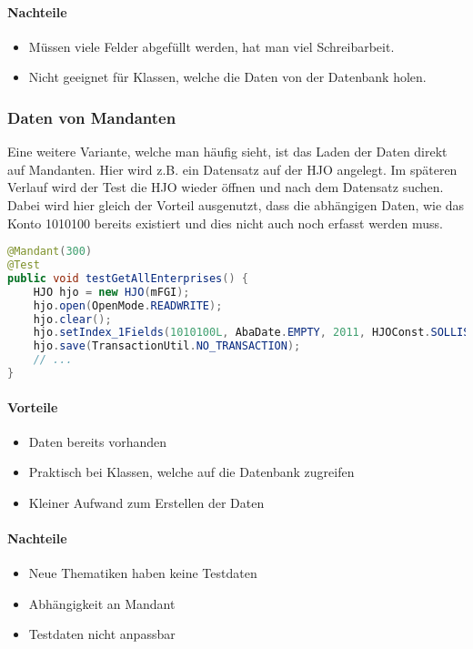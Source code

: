 \paragraph{Nachteile}
\begin{itemize}
\item Müssen viele Felder abgefüllt werden, hat man viel Schreibarbeit.
\item Nicht geeignet für Klassen, welche die Daten von der Datenbank holen.
\end{itemize}
\subsubsection{Daten von Mandanten}
Eine weitere Variante, welche man häufig sieht, ist das Laden der Daten direkt auf Mandanten. Hier wird z.B. ein Datensatz auf der HJO angelegt. Im späteren Verlauf wird der Test die HJO wieder öffnen und nach dem Datensatz suchen. Dabei wird hier gleich der Vorteil ausgenutzt, dass die abhängigen Daten, wie das Konto 1010100 bereits existiert und dies nicht auch noch erfasst werden muss.
\begin{lstlisting}[language=Java, caption=Testmethode mit Daten vom Mandant]
@Mandant(300)
@Test
public void testGetAllEnterprises() {
	HJO hjo = new HJO(mFGI);
	hjo.open(OpenMode.READWRITE);
	hjo.clear();
	hjo.setIndex_1Fields(1010100L, AbaDate.EMPTY, 2011, HJOConst.SOLLIST_0, 0, 1);
	hjo.save(TransactionUtil.NO_TRANSACTION);
	// ...
}
\end{lstlisting}
\paragraph{Vorteile}
\begin{itemize}
\item Daten bereits vorhanden
\item Praktisch bei Klassen, welche auf die Datenbank zugreifen
\item Kleiner Aufwand zum Erstellen der Daten
\end{itemize}
\paragraph{Nachteile}
\begin{itemize}
\item Neue Thematiken haben keine Testdaten
\item Abhängigkeit an Mandant
\item Testdaten nicht anpassbar
\end{itemize}

